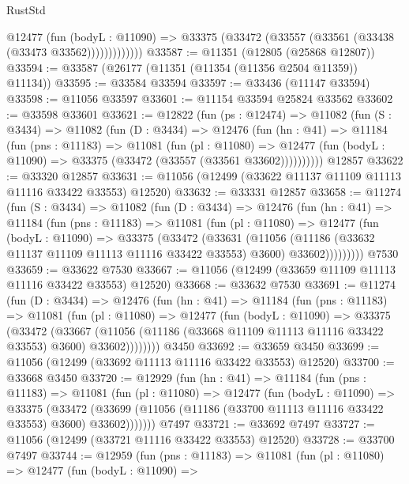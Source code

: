 \begin{lexlean}{RustStd}
\begin{coremodule}
                @12477
                  (fun (bodyL : @11090) =>
                  @33375 (@33472 (@33557 (@33561 (@33438 (@33473 @33562)))))))))))))
@33587 := @11351 (@12805 (@25868 @12807))
@33594 := @33587 (@26177 (@11351 (@11354 (@11356 @2504 @11359)) @11134))
@33595 := @33584 @33594
@33597 := @33436 (@11147 @33594)
@33598 := @11056 @33597
@33601 := @11154 @33594 @25824 @33562
@33602 := @33598 @33601
@33621 := @12822
    (fun (ps : @12474) =>
    @11082
      (fun (S : @3434) =>
      @11082
        (fun (D : @3434) =>
        @12476
          (fun (hn : @41) =>
          @11184
            (fun (pns : @11183) =>
            @11081
              (fun (pl : @11080) =>
              @12477 (fun (bodyL : @11090) => @33375 (@33472 (@33557 (@33561 @33602))))))))))
    @12857
@33622 := @33320 @12857
@33631 := @11056 (@12499 (@33622 @11137 @11109 @11113 @11116 @33422 @33553) @12520)
@33632 := @33331 @12857
@33658 := @11274
    (fun (S : @3434) =>
    @11082
      (fun (D : @3434) =>
      @12476
        (fun (hn : @41) =>
        @11184
          (fun (pns : @11183) =>
          @11081
            (fun (pl : @11080) =>
            @12477
              (fun (bodyL : @11090) =>
              @33375
                (@33472
                  (@33631
                    (@11056
                      (@11186 (@33632 @11137 @11109 @11113 @11116 @33422 @33553) @3600)
                      @33602)))))))))
    @7530
@33659 := @33622 @7530
@33667 := @11056 (@12499 (@33659 @11109 @11113 @11116 @33422 @33553) @12520)
@33668 := @33632 @7530
@33691 := @11274
    (fun (D : @3434) =>
    @12476
      (fun (hn : @41) =>
      @11184
        (fun (pns : @11183) =>
        @11081
          (fun (pl : @11080) =>
          @12477
            (fun (bodyL : @11090) =>
            @33375
              (@33472
                (@33667
                  (@11056 (@11186 (@33668 @11109 @11113 @11116 @33422 @33553) @3600) @33602))))))))
    @3450
@33692 := @33659 @3450
@33699 := @11056 (@12499 (@33692 @11113 @11116 @33422 @33553) @12520)
@33700 := @33668 @3450
@33720 := @12929
    (fun (hn : @41) =>
    @11184
      (fun (pns : @11183) =>
      @11081
        (fun (pl : @11080) =>
        @12477
          (fun (bodyL : @11090) =>
          @33375
            (@33472
              (@33699 (@11056 (@11186 (@33700 @11113 @11116 @33422 @33553) @3600) @33602)))))))
    @7497
@33721 := @33692 @7497
@33727 := @11056 (@12499 (@33721 @11116 @33422 @33553) @12520)
@33728 := @33700 @7497
@33744 := @12959
    (fun (pns : @11183) =>
    @11081
      (fun (pl : @11080) =>
      @12477
        (fun (bodyL : @11090) =>

\end{coremodule}
\end{lexlean}
